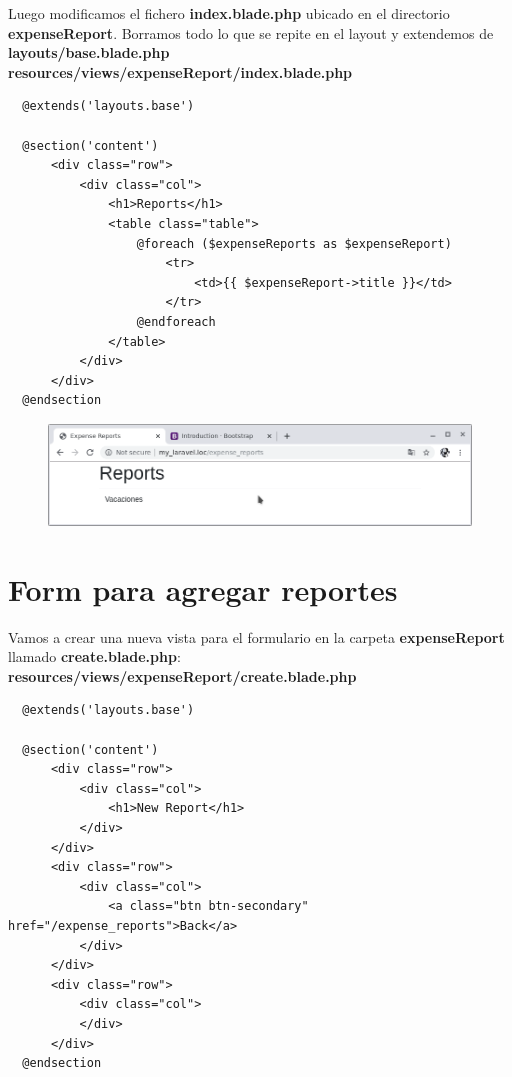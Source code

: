 \documentclass{article}
\begin{document}
Luego modificamos el fichero \textbf{index.blade.php} ubicado en el directorio
\textbf{expenseReport}. Borramos todo lo que se repite en el layout y
extendemos de \textbf{layouts/base.blade.php}\\

\textbf{resources/views/expenseReport/index.blade.php}
\begin{verbatim}
  @extends('layouts.base')

  @section('content')
      <div class="row">
          <div class="col">
              <h1>Reports</h1>
              <table class="table">
                  @foreach ($expenseReports as $expenseReport)
                      <tr>
                          <td>{{ $expenseReport->title }}</td>
                      </tr>
                  @endforeach
              </table>
          </div>
      </div>
  @endsection
\end{verbatim}

\begin{figure}[h!]
  \centering
  \includegraphics[scale=0.6]{./Pictures/054_extends_layout.png}
\end{figure}

\newpage


\section{Form para agregar reportes}%

Vamos a crear una nueva vista para el formulario en la carpeta
\textbf{expenseReport} llamado \textbf{create.blade.php}:\\

\textbf{resources/views/expenseReport/create.blade.php}
\begin{verbatim}
  @extends('layouts.base')

  @section('content')
      <div class="row">
          <div class="col">
              <h1>New Report</h1>
          </div>
      </div>
      <div class="row">
          <div class="col">
              <a class="btn btn-secondary" href="/expense_reports">Back</a>
          </div>
      </div>
      <div class="row">
          <div class="col">
          </div>
      </div>
  @endsection
\end{verbatim}
\end{document}
